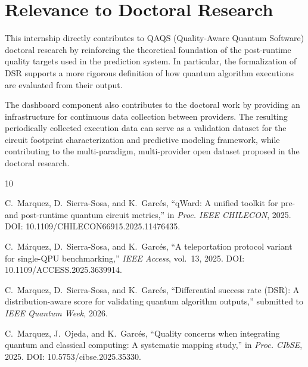 \documentclass[11pt]{article}
\begin{document}
\section{Relevance to Doctoral Research}

This internship directly contributes to QAQS (Quality-Aware Quantum Software) doctoral research by reinforcing the theoretical foundation of the post-runtime quality targets used in the prediction system. In particular, the formalization of DSR supports a more rigorous definition of how quantum algorithm executions are evaluated from their output.

The dashboard component also contributes to the doctoral work by providing an infrastructure for continuous data collection between providers. The resulting periodically collected execution data can serve as a validation dataset for the circuit footprint characterization and predictive modeling framework, while contributing to the multi-paradigm, multi-provider open dataset proposed in the doctoral research.


\begin{thebibliography}{10}

C.~Marquez, D.~Sierra-Sosa, and K.~Garc\'es, ``qWard: A unified toolkit for pre- and post-runtime quantum circuit metrics,'' in \emph{Proc. IEEE CHILECON}, 2025. DOI: 10.1109/CHILECON66915.2025.11476435.

C.~M\'arquez, D.~Sierra-Sosa, and K.~Garc\'es, ``A teleportation protocol variant for single-QPU benchmarking,'' \emph{IEEE Access}, vol.~13, 2025. DOI: 10.1109/ACCESS.2025.3639914.

C.~Marquez, D.~Sierra-Sosa, and K.~Garc\'es, ``Differential success rate (DSR): A distribution-aware score for validating quantum algorithm outputs,'' submitted to \emph{IEEE Quantum Week}, 2026.

C.~Marquez, J.~Ojeda, and K.~Garc\'es, ``Quality concerns when integrating quantum and classical computing: A systematic mapping study,'' in \emph{Proc. CIbSE}, 2025. DOI: 10.5753/cibse.2025.35330.

\end{thebibliography}
\end{document}
